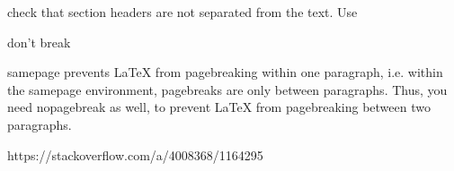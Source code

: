 check that section headers are not separated from the text. Use
\begin{samepage}
don't break
\end{samepage}

samepage prevents LaTeX from pagebreaking within one paragraph, i.e. within the samepage environment, pagebreaks are only between paragraphs. Thus, you need nopagebreak as well, to prevent LaTeX from pagebreaking between two paragraphs.

https://stackoverflow.com/a/4008368/1164295